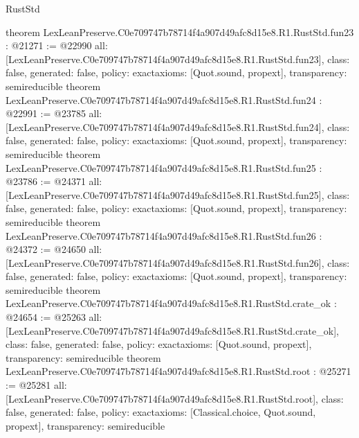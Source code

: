 \begin{lexlean}{RustStd}
\begin{coremodule}
{}
theorem LexLeanPreserve.C0e709747b78714f4a907d49afc8d15e8.R1.RustStd.fun23 : @21271 := @22990 {
  all: [LexLeanPreserve.C0e709747b78714f4a907d49afc8d15e8.R1.RustStd.fun23],
  class: false,
  generated: false,
  policy: exact{axioms: [Quot.sound, propext]},
  transparency: semireducible
}
theorem LexLeanPreserve.C0e709747b78714f4a907d49afc8d15e8.R1.RustStd.fun24 : @22991 := @23785 {
  all: [LexLeanPreserve.C0e709747b78714f4a907d49afc8d15e8.R1.RustStd.fun24],
  class: false,
  generated: false,
  policy: exact{axioms: [Quot.sound, propext]},
  transparency: semireducible
}
theorem LexLeanPreserve.C0e709747b78714f4a907d49afc8d15e8.R1.RustStd.fun25 : @23786 := @24371 {
  all: [LexLeanPreserve.C0e709747b78714f4a907d49afc8d15e8.R1.RustStd.fun25],
  class: false,
  generated: false,
  policy: exact{axioms: [Quot.sound, propext]},
  transparency: semireducible
}
theorem LexLeanPreserve.C0e709747b78714f4a907d49afc8d15e8.R1.RustStd.fun26 : @24372 := @24650 {
  all: [LexLeanPreserve.C0e709747b78714f4a907d49afc8d15e8.R1.RustStd.fun26],
  class: false,
  generated: false,
  policy: exact{axioms: [Quot.sound, propext]},
  transparency: semireducible
}
theorem LexLeanPreserve.C0e709747b78714f4a907d49afc8d15e8.R1.RustStd.crate_ok : @24654 := @25263 {
  all: [LexLeanPreserve.C0e709747b78714f4a907d49afc8d15e8.R1.RustStd.crate_ok],
  class: false,
  generated: false,
  policy: exact{axioms: [Quot.sound, propext]},
  transparency: semireducible
}
theorem LexLeanPreserve.C0e709747b78714f4a907d49afc8d15e8.R1.RustStd.root : @25271 := @25281 {
  all: [LexLeanPreserve.C0e709747b78714f4a907d49afc8d15e8.R1.RustStd.root],
  class: false,
  generated: false,
  policy: exact{axioms: [Classical.choice, Quot.sound, propext]},
  transparency: semireducible
}


\end{coremodule}
\end{lexlean}
